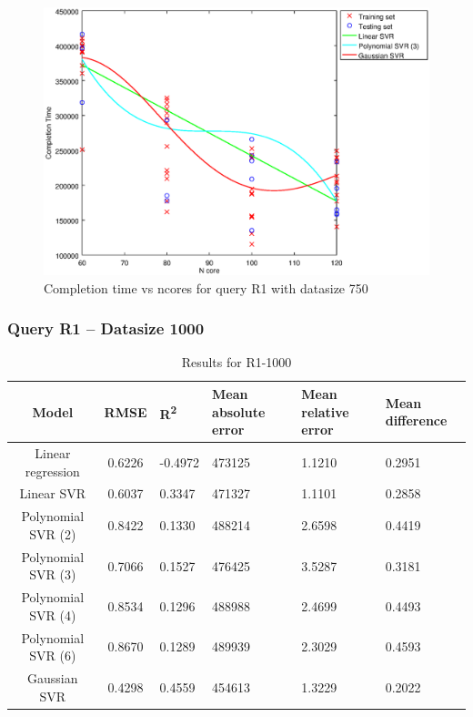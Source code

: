 \documentclass[a4paper,11pt]{article}
\begin{document}
\begin {figure}[hbtp]
\centering
\includegraphics[width=\textwidth]{output/R1_750_ONLY_1_LINEAR_NCORE/plot_R1_750_bestmodels.eps}
\caption{Completion time vs ncores for query R1 with datasize 750}
\label{fig:coreonly_linear_R1_750}
\end {figure}

\newpage
\subsubsection{Query R1 -- Datasize 1000}
\begin{table}[H]
	\centering
	\begin{adjustbox}{center}
		\begin{tabular}{c | c M{1.2cm} M{2.5cm} M{2.5cm} M{1.8cm}}
			Model & RMSE & R\textsuperscript{2} & Mean absolute error & Mean relative error & Mean difference \tabularnewline
			\hline
			Linear regression & 0.6226 & -0.4972 & 473125 & 1.1210 & 0.2951 \\
			Linear SVR & 0.6037 & 0.3347 & 471327 & 1.1101 & 0.2858 \\
			Polynomial SVR (2) & 0.8422 & 0.1330 & 488214 & 2.6598 & 0.4419 \\
			Polynomial SVR (3) & 0.7066 & 0.1527 & 476425 & 3.5287 & 0.3181 \\
			Polynomial SVR (4) & 0.8534 & 0.1296 & 488988 & 2.4699 & 0.4493 \\
			Polynomial SVR (6) & 0.8670 & 0.1289 & 489939 & 2.3029 & 0.4593 \\
			Gaussian SVR & 0.4298 & 0.4559 & 454613 & 1.3229 & 0.2022 \\
		\end{tabular}
	\end{adjustbox}
	\\
	\caption{Results for R1-1000}
	\label{fig:coreonly_linear_R1_1000}
\end{table}
\end{document}

